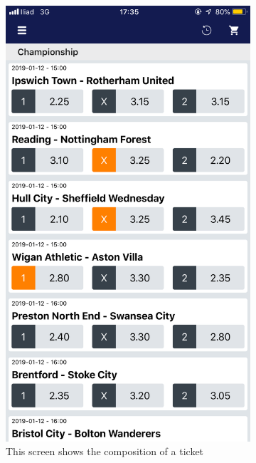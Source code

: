 \documentclass[numbers=noenddot, 12pt, a4paper, oneside]{scrbook}
\begin{document}
\begin{figure}[H]
	\begin{subfigure}{.5\textwidth}
		\centering
		\includegraphics[width=.8\linewidth]{images/Screen/ComposizioneSchedina}
		\caption{This screen shows the composition of a ticket}
	\end{subfigure}
	\begin{subfigure}{.5\textwidth}
		\centering

\end{subfigure}
\end{figure}
\end{document}
